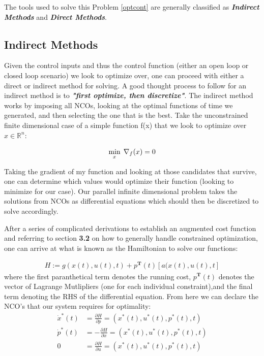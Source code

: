 \documentclass[twoside]{article}
\begin{document}
The tools used to solve this Problem \ref{optcont} are generally classified as \textit{\textbf{Indirect Methods}} and \textit{\textbf{Direct Methods}}.



\subsection{Indirect Methods}

Given the control inputs and thus the control function (either an open loop or closed loop scenario) we look to optimize over, one can proceed with either a direct or indirect method for solving. A good thought process to follow for an indirect method is to \textit{\textbf{"first optimize, then discretize"}}. The indirect method works by imposing all NCOs, looking at the optimal functions of time we generated, and then selecting the one that is the best. Take the unconstrained finite dimensional case of a simple function f(x) that we look to optimize over $x \in \mathbb{R}^n$:

$$\underset{x}{\text{min}} \:\: \nabla_f(x) = 0 \\$$

Taking the gradient of my function and looking at those candidates that survive, one can determine which values would optimize their function (looking to minimize for our case). Our parallel infinite dimensional problem takes the solutions from NCOs as differential equations which should then be discretized to solve accordingly.

After a series of complicated derivations to establish an augmented cost function and referring to section \textbf{3.2} on how to generally handle constrained optimization, one can arrive at what is known as the Hamiltonian to solve our functions:

\begin{equation} \label{hamiltonian}
\begin{split}
H := g(x(t), u(t), t) + p^\textbf{T}(t)[a(x(t), u(t), t]
\end{split}
\end{equation}
where the first paranthetical term denotes the running cost, $p^\textbf{T}(t)$ denotes the vector of Lagrange Mutlipliers (one for each individual constraint),and the final term denoting the RHS of the differential equation.
From here we can declare the NCO's that our system requires for optimality:
\begin{equation} \label{hamiltonianNCOs}
\begin{split}
\dot{x}^*(t) &= \frac{\partial{H}}{\partial{p}} = (x^*(t), u^*(t), p^*(t), t)\\
\dot{p}^*(t) &= -\frac{\partial{H}}{\partial{x}} = (x^*(t), u^*(t), p^*(t), t)\\
0 &= \frac{\partial{H}}{\partial{u}} = (x^*(t), u^*(t), p^*(t), t)
\end{split}
\end{equation}
\end{document}
